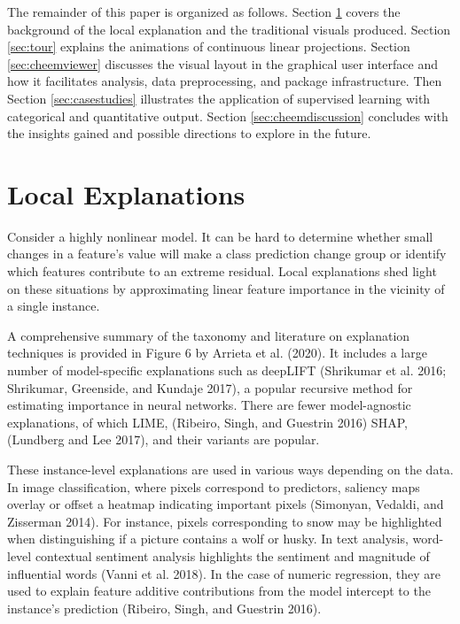 \documentclass[11pt,twoside]{article}
\begin{document}
The remainder of this paper is organized as follows. Section \ref{sec:explanations} covers the background of the local explanation and the traditional visuals produced. Section \ref{sec:tour} explains the animations of continuous linear projections. Section \ref{sec:cheemviewer} discusses the visual layout in the graphical user interface and how it facilitates analysis, data preprocessing, and package infrastructure. Then Section \ref{sec:casestudies} illustrates the application of supervised learning with categorical and quantitative output. Section \ref{sec:cheemdiscussion} concludes with the insights gained and possible directions to explore in the future.

\hypertarget{sec:explanations}{%
\section{Local Explanations}\label{sec:explanations}}

Consider a highly nonlinear model. It can be hard to determine whether small changes in a feature's value will make a class prediction change group or identify which features contribute to an extreme residual. Local explanations shed light on these situations by approximating linear feature importance in the vicinity of a single instance.

A comprehensive summary of the taxonomy and literature on explanation techniques is provided in Figure 6 by Arrieta et al. (2020). It includes a large number of model-specific explanations such as deepLIFT (Shrikumar et al. 2016; Shrikumar, Greenside, and Kundaje 2017), a popular recursive method for estimating importance in neural networks. There are fewer model-agnostic explanations, of which LIME, (Ribeiro, Singh, and Guestrin 2016) SHAP, (Lundberg and Lee 2017), and their variants are popular.

These instance-level explanations are used in various ways depending on the data. In image classification, where pixels correspond to predictors, saliency maps overlay or offset a heatmap indicating important pixels (Simonyan, Vedaldi, and Zisserman 2014). For instance, pixels corresponding to snow may be highlighted when distinguishing if a picture contains a wolf or husky. In text analysis, word-level contextual sentiment analysis highlights the sentiment and magnitude of influential words (Vanni et al. 2018). In the case of numeric regression, they are used to explain feature additive contributions from the model intercept to the instance's prediction (Ribeiro, Singh, and Guestrin 2016).
\end{document}
